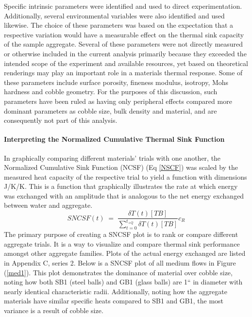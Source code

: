 Specific intrinsic parameters were identified and used to direct experimentation. Additionally, several environmental variables were also identified and used likewise. The choice of these parameters was based on the expectation that a respective variation would have a measurable effect on the thermal sink capacity of the sample aggregate. Several of these parameters were not directly measured or otherwise included in the current analysis primarily because they exceeded the intended scope of the experiment and available resources, yet based on theoretical renderings may play an important role in a materials thermal response. Some of these parameters include surface porosity, fineness modulus, isotropy, Mohs hardness and cobble geometry. For the purposes of this discussion, such parameters have been ruled as having only peripheral effects compared more dominant parameters as cobble size, bulk density and material, and are consequently not part of this analysis. 

\paragraph{Interpreting the Normalized Cumulative Thermal Sink Function}
In graphically comparing different materials' trials with one another, the Normalized Cumulative Sink Function (NCSF) (Eq \ref{NSCF}) was scaled by the measured heat capacity of the respective trial to yield a function with dimensions J/K/K. This is a function that graphically illustrates the rate at which energy was exchanged with an amplitude that is analogous to the net energy exchanged between water and aggregate. 
\begin{equation}\label{SNCSF}
 SNCSF(t)\;=\;\frac{\delta T(t)[TB]}{\sum_{t=0}^{t_{+Q}}\delta T(t)[TB]}c_{R}
\end{equation}
The primary purpose of creating a SNCSF plot is to rank or compare different aggregate trials. It is a way to visualize and compare thermal sink performance amongst other aggregate families. Plots of the actual energy exchanged are listed in Appendix C, series 2. Below is a SNCSF plot of all medium flows in Figure (\ref{med1}). This plot demonstrates the dominance of material over cobble size, noting how both SB1 (steel balls) and GB1 (glass balls) are 1`` in diameter with nearly identical characteristic radii. Additionally, noting how the aggregate materials have similar specific heats compared to SB1 and GB1, the most variance is a result of cobble size. 

